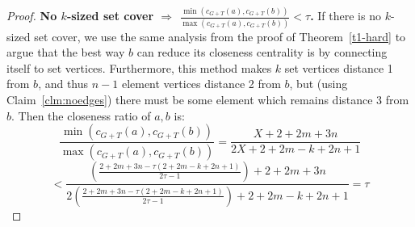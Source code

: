 \begin{proof}
    \textbf{No $k$-sized set cover $\Longrightarrow$ $\frac{\min(c_{G+T}(a),c_{G+T}(b))}{\max(c_{G+T}(a),c_{G+T}(b))}<\tau$.} If there is no $k$-sized set cover, we use the same analysis from the proof of Theorem~\ref{t1-hard} to argue that the best way $b$ can reduce its closeness centrality is by connecting itself to set vertices. Furthermore, this method makes $k$ set vertices distance 1 from $b$, and thus $n-1$ element vertices distance 2 from $b$, but (using Claim~\ref{clm:noedges}) there must be some element which remains distance 3 from $b$. Then the closeness ratio of $a,b$ is:
    \[\frac{\min(c_{G+T}(a),c_{G+T}(b))}{\max(c_{G+T}(a),c_{G+T}(b))}=\frac{X+2+2m+3n}{2X+2+2m-k+2n+1}\]\[<\frac{(\frac{2+2m+3n-\tau(2+2m-k+2n+1)}{2\tau-1})+2+2m+3n}{2(\frac{2+2m+3n-\tau(2+2m-k+2n+1)}{2\tau-1})+2+2m-k+2n+1}=\tau\]
\end{proof}